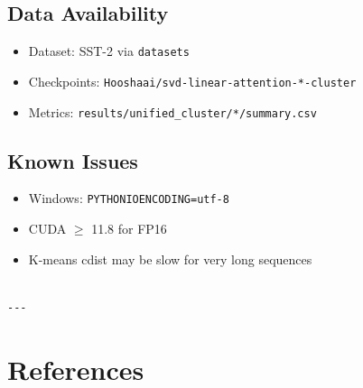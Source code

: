 \subsection{Data Availability}

\begin{itemize}
\item Dataset: SST-2 via \texttt{datasets}
\item Checkpoints: \texttt{Hooshaai/svd-linear-attention-*-cluster}
\item Metrics: \texttt{results/unified\_cluster/*/summary.csv}

\end{itemize}
\subsection{Known Issues}

\begin{itemize}
\item Windows: \texttt{PYTHONIOENCODING=utf-8}
\item CUDA $\ge$ 11.8 for FP16
\item K-means cdist may be slow for very long sequences
\end{itemize}
\begin{lstlisting}

---
\end{lstlisting}

\section{References}

